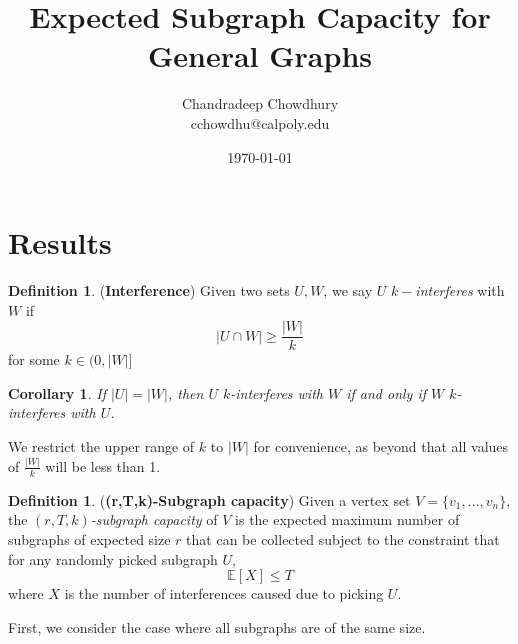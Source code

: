 \documentclass[10pt]{extarticle}
\title{\textbf{Expected Subgraph Capacity for General Graphs}}
\author{Chandradeep Chowdhury \\ cchowdhu@calpoly.edu}
\date{\today}
\newcommand{\E}{\mathbb{E}}
\newtheorem{corollary}[theorem]{Corollary}
\theoremstyle{definition}
\newtheorem{definition}[theorem]{Definition}
\begin{document}

\section{Results}

\begin{definition}
    (\textbf{Interference}) Given two sets $U, W$, we say $U$ $k-$\textit{interferes} with $W$ if 
    \begin{equation}
        |U \cap W| \ge  \frac{|W|}{k}
    \end{equation}
    for some $k \in (0,|W|]$
\end{definition}

\begin{corollary}
    If $|U| = |W|$, then $U$ $k$-interferes with $W$ if and only if $W$ $k$-interferes with $U$.
\end{corollary}

We restrict the upper range of $k$ to $|W|$ for convenience, as beyond that all values of $\frac{|W|}{k}$ will be less than 1.

\begin{definition} (\textbf{(r,T,k)-Subgraph capacity}) Given a vertex set $V = \{v_1,...,v_n\}$, the \textit{$(r,T,k)$-subgraph capacity} of $V$ is the expected maximum number of subgraphs of expected size $r$ that can be collected subject to the constraint that for any randomly picked subgraph $U$, 
\begin{equation}
    \E[X] \le T
\end{equation}
where $X$ is the number of interferences caused due to picking $U$. 
\end{definition}

First, we consider the case where all subgraphs are of the same size.
\end{document}
